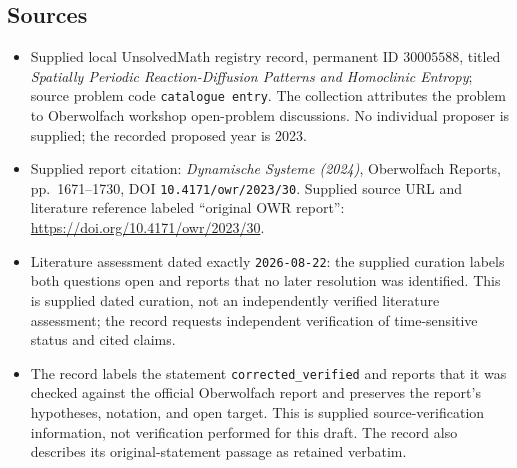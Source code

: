 \documentclass[11pt]{article}
\begin{document}
\subsection{Sources}
\begin{itemize}
\item Supplied local UnsolvedMath registry record, permanent ID \(30005588\), titled \emph{Spatially Periodic Reaction-Diffusion Patterns and Homoclinic Entropy}; source problem code \texttt{catalogue entry}. The collection attributes the problem to Oberwolfach workshop open-problem discussions. No individual proposer is supplied; the recorded proposed year is 2023.
\item Supplied report citation: \emph{Dynamische Systeme (2024)}, Oberwolfach Reports, pp.\ 1671--1730, DOI \texttt{10.4171/owr/2023/30}. Supplied source URL and literature reference labeled ``original OWR report'': \url{https://doi.org/10.4171/owr/2023/30}.
\item Literature assessment dated exactly \texttt{2026-08-22}: the supplied curation labels both questions open and reports that no later resolution was identified. This is supplied dated curation, not an independently verified literature assessment; the record requests independent verification of time-sensitive status and cited claims.
\item The record labels the statement \texttt{corrected\_verified} and reports that it was checked against the official Oberwolfach report and preserves the report's hypotheses, notation, and open target. This is supplied source-verification information, not verification performed for this draft. The record also describes its original-statement passage as retained verbatim.
\end{itemize}
\end{document}
